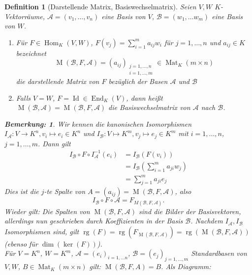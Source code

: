 \documentclass{report}
\newcommand{\baseb}{\mathcal{B}}
\newcommand{\basea}{\mathcal{A}}
\DeclareMathOperator{\Hom}{Hom}
\DeclareMathOperator{\End}{End}
\DeclareMathOperator{\rg}{rg}
\DeclareMathOperator{\Mat}{Mat}
\DeclareMathOperator{\Id}{Id}
\DeclareMathOperator{\M}{M}
\theoremstyle{customrem}
\newtheorem*{bemerkung}{Bemerkung\textnormal:}
\theoremstyle{customdef}
\newtheorem{definition}{Definition}[chapter]
\begin{document}
	\begin{definition}[Darstellende Matrix, Basiswechselmatrix]
		Seien $V,W$ $K$-Vektorräume, $\basea=(v_1, \ldots, v_n)$ eine Basis von $V$, $\baseb = (w_1,\ldots w_m)$ eine Basis von $W$.
		\begin{enumerate}
			\item Für $F\in\Hom_K(V, W)$, $F(v_j) = \sum_{i=1}^{m}a_{ij}w_i$ für $j=1, \ldots, n$ und $a_{ij}\in K$ bezeichnet $$\M(\baseb, F, \basea) = (a_{ij})_{\substack{j=1,\ldots, n\;\\i=1, \ldots, m}}\in\Mat_K(m\times n)$$ die \textsl{darstellende Matrix} von $F$ bezüglich der Basen $\basea$ und $\baseb$
			\item Falls $V=W$, $F=\Id\in\End_K(V)$, dann heißt $\M(\baseb, \basea) = \M(\baseb, F, \basea)$ die \textsl{Basiswechselmatrix} von $\basea$ nach $\baseb$.
		\end{enumerate}
		
		\begin{bemerkung}
			Wir kennen die kanonischen Isomorphismen $I_\basea:V\to K^n, v_i\mapsto e_i\in K^n$ und $I_\baseb:V\mapsto K^m, v_j\mapsto e_j\in K^m$ mit $i=1, \ldots, n$, $j=1,\ldots, m$. Dann gilt 
			\begin{align*}
				I_\baseb\circ F\circ I_\basea^{-1}(e_i) &= I_\baseb(F(v_i))\\
																  &= I_\baseb\left(\sum_{i=1}^{m}a_{ji}w_j\right) \\
																  &= \sum_{j=1}^{m}a_{ji}e_j
			\end{align*}
			Dies ist die $j$-te Spalte von $A=(a_{ij})=\M(\baseb, F, \basea)$, also $$I_\baseb\circ F\circ \basea=F_{M(\baseb, F, \basea)}.$$ Wieder gilt: Die Spalten von $\M(\baseb, F, \basea)$ sind die Bilder der Basisvektoren, allerdings nun geschrieben durch Koeffizienten in der Basis $\baseb$. Nachdem $I_\basea, I_\baseb$ Isomorphismen sind, gilt $\rg(F)=\rg(F_{\M(\baseb, F, \basea)})=\rg(\M(\baseb, F, \basea))$ (ebenso für $\dim(\ker(F))$). \\
			
			Für $V=K^n$, $W=K^m$, $\basea=(e_i)_{i=1,\ldots n}$, $\baseb=(e_j)_{j=1, \ldots, m}$ Standardbasen von $V, W$, $B\in\Mat_K(m\times n)$ gilt: $\M(\baseb, F, A)=B$. Als Diagramm:
			

\end{bemerkung}
\end{definition}
\end{document}

